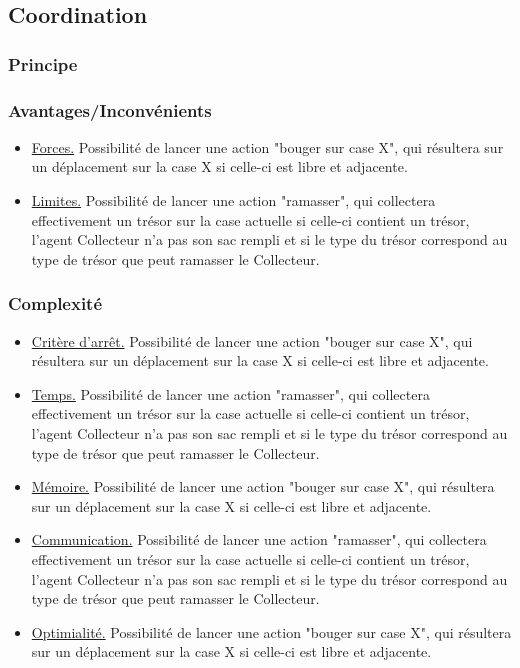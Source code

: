 \documentclass[a4paper, 10pt]{article}
\begin{document}
\subsection{Coordination}

\subsubsection{Principe}

\blindtext

\subsubsection{Avantages/Inconvénients}

\begin{itemize}
            \item \underline{Forces.} Possibilité de lancer une action "bouger sur case X", qui résultera sur un déplacement sur la case {X} si celle-ci est libre et adjacente.
            \item \underline{Limites.} Possibilité de lancer une action "ramasser", qui collectera effectivement un trésor sur la case actuelle si celle-ci contient un trésor, l'agent Collecteur n'a pas son sac rempli et si le type du trésor correspond au type de trésor que peut ramasser le Collecteur.
\end{itemize}


\subsubsection{Complexité}

\begin{itemize}
            \item \underline{Critère d'arrêt.} Possibilité de lancer une action "bouger sur case X", qui résultera sur un déplacement sur la case {X} si celle-ci est libre et adjacente.
            \item \underline{Temps.} Possibilité de lancer une action "ramasser", qui collectera effectivement un trésor sur la case actuelle si celle-ci contient un trésor, l'agent Collecteur n'a pas son sac rempli et si le type du trésor correspond au type de trésor que peut ramasser le Collecteur.
            \item \underline{Mémoire.} Possibilité de lancer une action "bouger sur case X", qui résultera sur un déplacement sur la case {X} si celle-ci est libre et adjacente.
            \item \underline{Communication.} Possibilité de lancer une action "ramasser", qui collectera effectivement un trésor sur la case actuelle si celle-ci contient un trésor, l'agent Collecteur n'a pas son sac rempli et si le type du trésor correspond au type de trésor que peut ramasser le Collecteur.
            \item \underline{Optimialité.} Possibilité de lancer une action "bouger sur case X", qui résultera sur un déplacement sur la case {X} si celle-ci est libre et adjacente.
\end{itemize}
\end{document}
